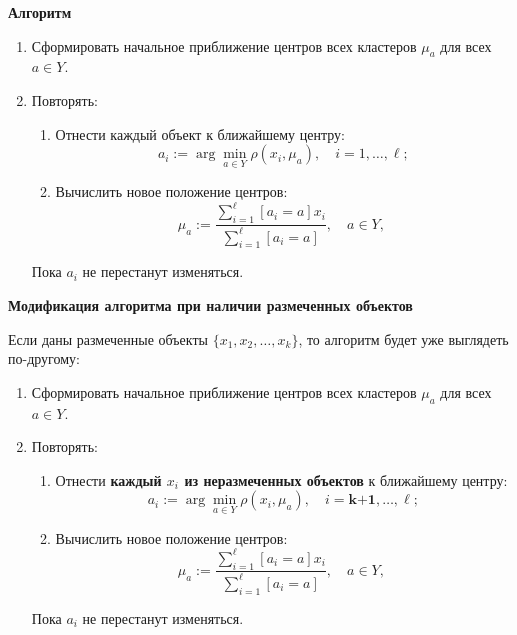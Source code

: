 \textbf{Алгоритм}
\begin{enumerate}
    \item Сформировать начальное приближение центров всех кластеров  $\mu_a$ для всех ${a \in Y}$.
    \item Повторять:
    \begin{enumerate}
        \item Отнести каждый объект к ближайшему центру:  
        \[
        a_i := \arg \min_{a \in Y} \rho(x_i, \mu_a), \quad i = 1, \ldots, \ell;
        \]
        \item Вычислить новое положение центров:  
        \[
        \mu_{a} := \frac{\sum_{i=1}^\ell [a_i = a] x_i}{\sum_{i=1}^\ell [a_i = a]}, 
        \quad a \in Y, \; 
        \]
    \end{enumerate}
    Пока $a_i$ не перестанут изменяться.
\end{enumerate}

\textbf{Модификация алгоритма 
при наличии размеченных объектов}

Если даны размеченные объекты $\{x_1, x_2, \ldots, x_k\}$, то алгоритм будет уже выглядеть по-другому:

\begin{enumerate}
    \item Сформировать начальное приближение центров всех кластеров  $\mu_a$ для всех ${a \in Y}$.
    \item Повторять:
    \begin{enumerate}
        \item Отнести \textbf{каждый $x_{i}$ из неразмеченных объектов} к ближайшему центру:  
        \[
        a_i := \arg \min_{a \in Y} \rho(x_i, \mu_a), \quad i = \textbf{k+1}, \ldots, \ell;
        \]
        \item Вычислить новое положение центров:  
        \[
        \mu_{a} := \frac{\sum_{i=1}^\ell [a_i = a] x_i}{\sum_{i=1}^\ell [a_i = a]}, 
        \quad a \in Y, \; 
        \]
    \end{enumerate}
    Пока $a_i$ не перестанут изменяться.
\end{enumerate}

